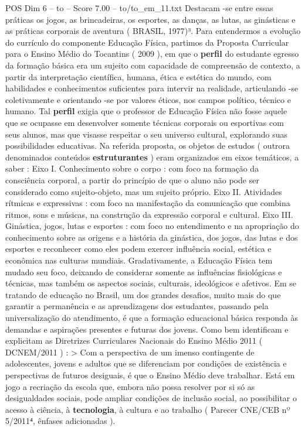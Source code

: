\begin{textsample}{POS Dim 6 – to – Score 7.00 – to/to\_em\_11.txt}
Destacam -se entre essas práticas os jogos, as brincadeiras, os esportes, as danças, as lutas, as ginásticas e as práticas corporais de aventura ( BRASIL, 1977)³.
Para entendermos a evolução do currículo do componente Educação Física, partimos da Proposta Curricular para o Ensino Médio do Tocantins ( 2009 ), em que o \textbf{perfil} do estudante egresso da formação básica era um sujeito com capacidade de compreensão de contexto, a partir da interpretação científica, humana, ética e estética do mundo, com habilidades e conhecimentos suficientes para intervir na realidade, articulando -se coletivamente e orientando -se por valores éticos, nos campos político, técnico e humano.
Tal \textbf{perfil} exigia que o professor de Educação Física não fosse aquele que se ocupasse em desenvolver somente técnicas corporais ou esportivas com seus alunos, mas que visasse respeitar o seu universo cultural, explorando suas possibilidades educativas.
Na referida proposta, os objetos de estudos ( outrora denominados conteúdos \textbf{estruturantes} ) eram organizados em eixos temáticos, a saber : Eixo I.
Conhecimento sobre o corpo : com foco na formação da consciência corporal, a partir do princípio de que o aluno não pode ser considerado como sujeito-objeto, mas um sujeito próprio.
Eixo II.
Atividades rítmicas e expressivas : com foco na manifestação da comunicação que combina ritmos, sons e músicas, na construção da expressão corporal e cultural.
Eixo III.
Ginástica, jogos, lutas e esportes : com foco no entendimento e na apropriação do conhecimento sobre as origens e a história da ginástica, dos jogos, das lutas e dos esportes e reconhecer como eles podem exercer influência social, estética e econômica nas culturas mundiais.
Gradativamente, a Educação Física tem mudado seu foco, deixando de considerar somente as influências fisiológicas e técnicas, mas também os aspectos sociais, culturais, ideológicos e afetivos.
Em se tratando de educação no Brasil, um dos grandes desafios, muito mais do que garantir a permanência e as aprendizagens dos estudantes, passando pela universalização do atendimento, é que a formação educacional básica responda às demandas e aspirações presentes e futuras dos jovens.
Como bem identificam e explicitam as Diretrizes Curriculares Nacionais do Ensino Médio 2011 ( DCNEM/2011 ) : > Com a perspectiva de um imenso contingente de adolescentes, jovens e adultos que se diferenciam por condições de existência e perspectivas de futuros desiguais, é que o Ensino Médio deve trabalhar.
Está em jogo a recriação da escola que, embora não possa resolver por si só as desigualdades sociais, pode ampliar condições de inclusão social, ao possibilitar o acesso à ciência, à \textbf{tecnologia}, à cultura e ao trabalho ( Parecer CNE/CEB nº 5/2011⁴, ênfases adicionadas ).

\end{textsample}
